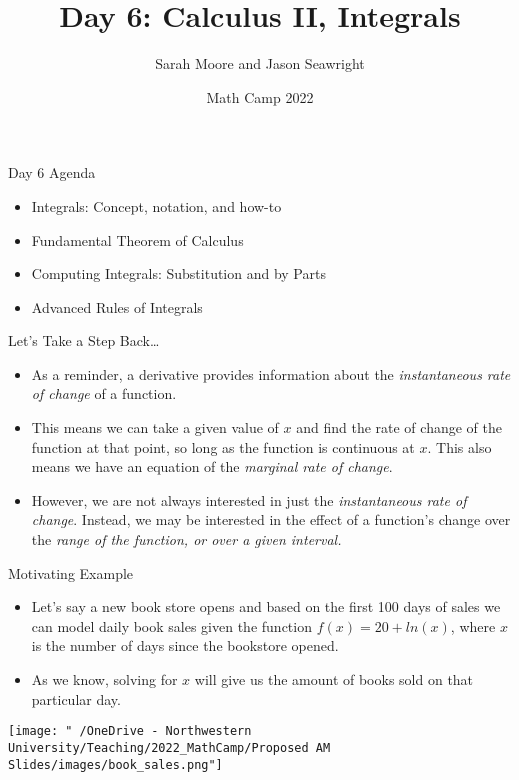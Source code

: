 \documentclass[
  ignorenonframetext,
]{beamer}
\title{Day 6: Calculus II, Integrals}
\author{Sarah Moore and Jason Seawright}
\date{Math Camp 2022}
\begin{document}
\frame{\titlepage}

\begin{frame}{Day 6 Agenda}
\protect\hypertarget{day-6-agenda}{}
\begin{itemize}
\item
  Integrals: Concept, notation, and how-to
\item
  Fundamental Theorem of Calculus
\item
  Computing Integrals: Substitution and by Parts
\item
  Advanced Rules of Integrals
\end{itemize}
\end{frame}

\begin{frame}{Let's Take a Step Back\ldots{}}
\protect\hypertarget{lets-take-a-step-back}{}
\begin{itemize}
\item
  As a reminder, a derivative provides information about the
  \emph{instantaneous rate of change} of a function.
\item
  This means we can take a given value of \(x\) and find the rate of
  change of the function at that point, so long as the function is
  continuous at \(x\). This also means we have an equation of the
  \emph{marginal rate of change}.
\item
  However, we are not always interested in just the \emph{instantaneous
  rate of change}. Instead, we may be interested in the effect of a
  function's change over the \emph{range of the function, or over a
  given interval.}
\end{itemize}
\end{frame}

\begin{frame}{Motivating Example}
\protect\hypertarget{motivating-example}{}
\begin{itemize}
\item
  Let's say a new book store opens and based on the first 100 days of
  sales we can model daily book sales given the function
  \(f(x)= 20 +ln(x)\), where \(x\) is the number of days since the
  bookstore opened.
\item
  As we know, solving for \(x\) will give us the amount of books sold on
  that particular day.
\end{itemize}

\centering

\texttt{[image: "~/OneDrive - Northwestern University/Teaching/2022\_MathCamp/Proposed AM Slides/images/book\_sales.png"]}
\end{frame}
\end{document}
